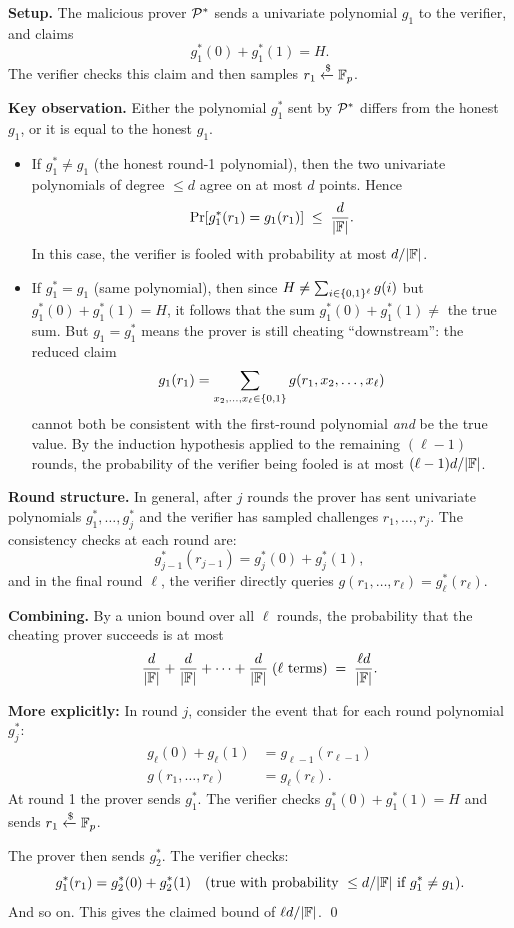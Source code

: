 \documentclass[11pt]{article}
\begin{document}
\begin{proofbox}

\textbf{Setup.}  The malicious prover $\mathcal{P}^*$ sends a univariate polynomial $g_1$ to the verifier, and claims
\[
  g_1^*(0) + g_1^*(1) = H.
\]
The verifier checks this claim and then samples $r_1 \xleftarrow{\$} \mathbb{F}_p$.

\medskip
\textbf{Key observation.}  Either the polynomial $g_1^*$ sent by $\mathcal{P}^*$ differs from the honest $g_1$, or it is equal to the honest $g_1$.

\begin{itemize}
  \item If $g_1^* \neq g_1$ (the honest round-1 polynomial), then the two univariate polynomials of degree $\le d$ agree on at most $d$ points.  Hence
  \[
    \Pr[g_1^*(r_1) = g_1(r_1)] \;\le\; \frac{d}{|\mathbb{F}|}.
  \]
  In this case, the verifier is fooled with probability at most $d/|\mathbb{F}|$.

  \item If $g_1^* = g_1$ (same polynomial), then since $H \neq \sum_{i\in\{0,1\}^\ell} g(i)$ but $g_1^*(0)+g_1^*(1) = H$, it follows that the sum $g_1^*(0)+g_1^*(1) \neq$ the true sum.  But $g_1 = g_1^*$ means the prover is still cheating ``downstream'': the reduced claim
  \[
    g_1(r_1) = \sum_{x_2,\ldots,x_\ell \in \{0,1\}} g(r_1, x_2, \ldots, x_\ell)
  \]
  cannot both be consistent with the first-round polynomial \emph{and} be the true value.  By the induction hypothesis applied to the remaining $(\ell - 1)$ rounds, the probability of the verifier being fooled is at most $(\ell-1)d/|\mathbb{F}|$.
\end{itemize}

\textbf{Round structure.}  In general, after $j$ rounds the prover has sent univariate polynomials $g_1^*, \ldots, g_j^*$ and the verifier has sampled challenges $r_1, \ldots, r_j$.  The consistency checks at each round are:
\[
  g_{j-1}^*(r_{j-1}) = g_j^*(0) + g_j^*(1),
\]
and in the final round $\ell$, the verifier directly queries $g(r_1, \ldots, r_\ell) = g_\ell^*(r_\ell)$.

\medskip
\textbf{Combining.}  By a union bound over all $\ell$ rounds, the probability that the cheating prover succeeds is at most
\[
  \frac{d}{|\mathbb{F}|} + \frac{d}{|\mathbb{F}|} + \cdots + \frac{d}{|\mathbb{F}|} \;(\ell \text{ terms})\;=\; \frac{\ell d}{|\mathbb{F}|}.
\]

\textbf{More explicitly:}  In round $j$, consider the event that for each round polynomial $g_j^*$:
\begin{align*}
  g_\ell(0) + g_\ell(1) &= g_{\ell-1}(r_{\ell-1}) \\
  g(r_1, \ldots, r_\ell) &= g_\ell(r_\ell).
\end{align*}
At round 1 the prover sends $g_1^*$.  The verifier checks $g_1^*(0) + g_1^*(1) = H$ and sends $r_1 \xleftarrow{\$} \mathbb{F}_p$.

The prover then sends $g_2^*$.  The verifier checks:
\[
  g_1^*(r_1) = g_2^*(0) + g_2^*(1) \quad \text{(true with probability } \le d/|\mathbb{F}| \text{ if } g_1^* \neq g_1 \text{)}.
\]
And so on.  This gives the claimed bound of $\ell d / |\mathbb{F}|$. \qed
\end{proofbox}
\end{document}
